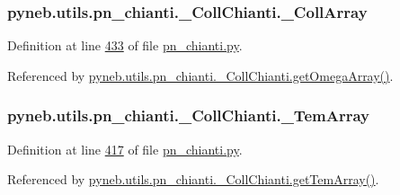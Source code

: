 \subsubsection[{\+\_\+\+Coll\+Array}]{\setlength{\rightskip}{0pt plus 5cm}pyneb.\+utils.\+pn\+\_\+chianti.\+\_\+\+Coll\+Chianti.\+\_\+\+Coll\+Array\hspace{0.3cm}{\ttfamily [private]}}\label{classpyneb_1_1utils_1_1pn__chianti_1_1___coll_chianti_a5cdf912f3bcbf25bcbbba1ba8fc072d9}


Definition at line \hyperlink{pn__chianti_8py_source_l00433}{433} of file \hyperlink{pn__chianti_8py_source}{pn\+\_\+chianti.\+py}.



Referenced by \hyperlink{pn__chianti_8py_source_l00461}{pyneb.\+utils.\+pn\+\_\+chianti.\+\_\+\+Coll\+Chianti.\+get\+Omega\+Array()}.

\hypertarget{classpyneb_1_1utils_1_1pn__chianti_1_1___coll_chianti_a7dc1ede29c8b436a27a20203cdb87f49}{}
\subsubsection[{\+\_\+\+Tem\+Array}]{\setlength{\rightskip}{0pt plus 5cm}pyneb.\+utils.\+pn\+\_\+chianti.\+\_\+\+Coll\+Chianti.\+\_\+\+Tem\+Array\hspace{0.3cm}{\ttfamily [private]}}\label{classpyneb_1_1utils_1_1pn__chianti_1_1___coll_chianti_a7dc1ede29c8b436a27a20203cdb87f49}


Definition at line \hyperlink{pn__chianti_8py_source_l00417}{417} of file \hyperlink{pn__chianti_8py_source}{pn\+\_\+chianti.\+py}.



Referenced by \hyperlink{pn__chianti_8py_source_l00521}{pyneb.\+utils.\+pn\+\_\+chianti.\+\_\+\+Coll\+Chianti.\+get\+Tem\+Array()}.

\hypertarget{classpyneb_1_1utils_1_1pn__chianti_1_1___coll_chianti_a904418982790fd63f2324fec90636bb6}{}
